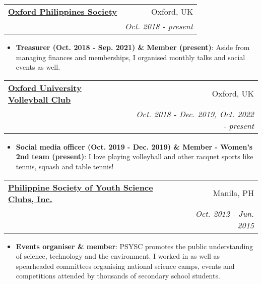 \documentclass[legalpaper,11pt]{article}
\makeatletter
\newcommand{\resumeItem}[2]{
  \item\small{
    \textbf{#1}{: #2 \vspace{-2pt}}
  }
}
\newcommand{\resumeSubheading}[4]{
  \vspace{-1pt}\item
    \begin{tabular*}{0.97\textwidth}[t]{l@{\extracolsep{\fill}}r}
      \textbf{#1} & #2 \\
      \textit{\small#3} & \textit{\small #4} \\
    \end{tabular*}\vspace{-5pt}
}
\newcommand{\resumeSubItem}[2]{\resumeItem{#1}{#2}\vspace{-4pt}}
\newcommand{\resumeSubHeadingListStart}{\begin{itemize}[leftmargin=*]}
\newcommand{\resumeSubHeadingListEnd}{\end{itemize}}
\newcommand{\resumeItemListStart}{\begin{itemize}}
\newcommand{\resumeItemListEnd}{\end{itemize}\vspace{-5pt}}
\makeatother
\begin{document}
    \resumeSubheading
      {\href{https://oxfordphilippinessociety.web.ox.ac.uk/home}{Oxford Philippines Society}}{Oxford, UK}
      {}{Oct. 2018 - present}
      \resumeItemListStart
        \resumeItem{Treasurer (Oct. 2018 - Sep. 2021) \& Member (present)}{Aside from managing finances and memberships, I organised monthly talks and social events as well.}
     \resumeItemListEnd
     
    \resumeSubheading
      {\href{https://ouvc.notion.site/ouvc/OUVC-Homepage-1d969e57c26c4426afc33d509b8736ca}{Oxford University Volleyball Club}}{Oxford, UK}
      {}{Oct. 2018 - Dec. 2019, Oct. 2022 - present}
      \resumeItemListStart
        \resumeItem{Social media officer (Oct. 2019 - Dec. 2019) \& Member - Women's 2nd team (present)}{I love playing volleyball and other racquet sports like tennis, squash and table tennis!}
     \resumeItemListEnd
     
  \resumeSubheading
      {\href{https://psysc.org/}{Philippine Society of Youth Science Clubs, Inc.}}{Manila, PH}
      {}{Oct. 2012 - Jun. 2015}
      \resumeItemListStart
        \resumeItem{Events organiser \& member}{PSYSC promotes the public understanding of science, technology and the environment. I worked in as well as spearheaded committees organising national science camps, events and competitions attended by thousands of secondary school students.}
     \resumeItemListEnd



  
\end{document}
